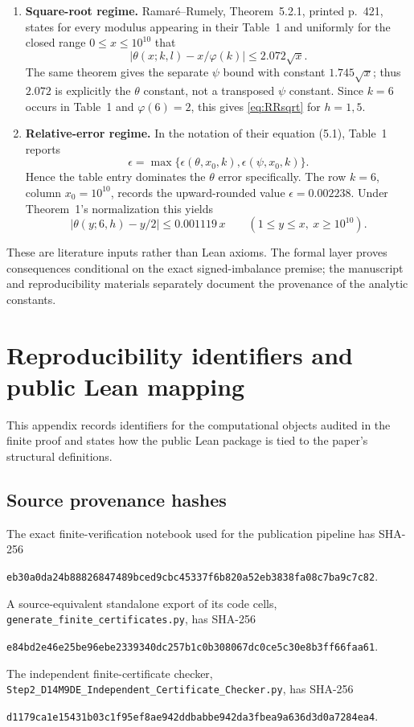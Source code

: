 \documentclass[11pt]{article}
\theoremstyle{definition}
\newcommand{\abs}[1]{\left|#1\right|}
\begin{document}
\begin{enumerate}
\item \textbf{Square-root regime.} Ramar\'{e}--Rumely, Theorem~5.2.1, printed p.~421, states for every modulus appearing in their Table~1 and uniformly for the closed range $0\le x\le10^{10}$ that
\[
\abs{\theta(x;k,l)-x/\varphi(k)}\le2.072\sqrt{x}.
\]
The same theorem gives the separate $\psi$ bound with constant $1.745\sqrt{x}$; thus $2.072$ is explicitly the $\theta$ constant, not a transposed $\psi$ constant. Since $k=6$ occurs in Table~1 and $\varphi(6)=2$, this gives \eqref{eq:RRsqrt} for $h=1,5$.

\item \textbf{Relative-error regime.} In the notation of their equation (5.1), Table~1 reports
\[
\epsilon=\max\{\epsilon(\theta,x_0,k),\epsilon(\psi,x_0,k)\}.
\]
Hence the table entry dominates the $\theta$ error specifically. The row $k=6$, column $x_0=10^{10}$, records the upward-rounded value $\epsilon=0.002238$. Under Theorem~1's normalization this yields
\[
\abs{\theta(y;6,h)-y/2}\le0.001119\,x
\qquad(1\le y\le x,\ x\ge10^{10}).
\]
\end{enumerate}

These are literature inputs rather than Lean axioms. The formal layer proves consequences conditional on the exact signed-imbalance premise; the manuscript and reproducibility materials separately document the provenance of the analytic constants.


\section{Reproducibility identifiers and public Lean mapping}\label{app:repro}

This appendix records identifiers for the computational objects audited in the finite proof and states how the public Lean package is tied to the paper's structural definitions.

\subsection*{Source provenance hashes}

The exact finite-verification notebook used for the publication pipeline has SHA-256
\begin{center}
\small\texttt{eb30a0da24b88826847489bced9cbc45337f6b820a52eb3838fa08c7ba9c7c82}.
\end{center}
A source-equivalent standalone export of its code cells, \texttt{generate\_finite\_certificates.py}, has SHA-256
\begin{center}
\small\texttt{e84bd2e46e25be96ebe2339340dc257b1c0b308067dc0ce5c30e8b3ff66faa61}.
\end{center}
The independent finite-certificate checker, \texttt{Step2\_D14M9DE\_Independent\_Certificate\_Checker.py}, has SHA-256
\begin{center}
\small\texttt{d1179ca1e15431b03c1f95ef8ae942ddbabbe942da3fbea9a636d3d0a7284ea4}.
\end{center}
\end{document}
